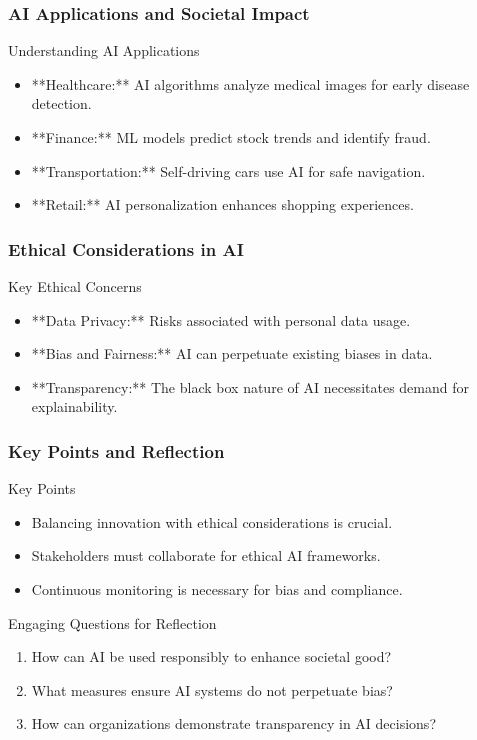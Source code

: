 \documentclass[aspectratio=169]{beamer}
\begin{document}
\begin{frame}[fragile]
    \frametitle{AI Applications and Societal Impact}
    \begin{block}{Understanding AI Applications}
        \begin{itemize}
            \item **Healthcare:** AI algorithms analyze medical images for early disease detection. 
            \item **Finance:** ML models predict stock trends and identify fraud.
            \item **Transportation:** Self-driving cars use AI for safe navigation.
            \item **Retail:** AI personalization enhances shopping experiences.
        \end{itemize}
    \end{block}
\end{frame}

\begin{frame}[fragile]
    \frametitle{Ethical Considerations in AI}
    \begin{block}{Key Ethical Concerns}
        \begin{itemize}
            \item **Data Privacy:** Risks associated with personal data usage.
            \item **Bias and Fairness:** AI can perpetuate existing biases in data.
            \item **Transparency:** The black box nature of AI necessitates demand for explainability.
        \end{itemize}
    \end{block}
\end{frame}

\begin{frame}[fragile]
    \frametitle{Key Points and Reflection}
    \begin{block}{Key Points}
        \begin{itemize}
            \item Balancing innovation with ethical considerations is crucial.
            \item Stakeholders must collaborate for ethical AI frameworks.
            \item Continuous monitoring is necessary for bias and compliance.
        \end{itemize}
    \end{block}
    
    \begin{block}{Engaging Questions for Reflection}
        \begin{enumerate}
            \item How can AI be used responsibly to enhance societal good?
            \item What measures ensure AI systems do not perpetuate bias?
            \item How can organizations demonstrate transparency in AI decisions?
        \end{enumerate}
    \end{block}
\end{frame}
\end{document}

